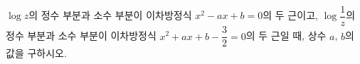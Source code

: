 $\log z$의 정수 부분과 소수 부분이 이차방정식 $x^2-ax+b=0$의 두 근이고, $\log\dfrac{1}{z}$의 정수 부분과 소수 부분이 이차방정식 $x^2+ax+b-\dfrac{3}{2}=0$의 두 근일 때, 상수 $a$, $b$의 값을 구하시오. 
